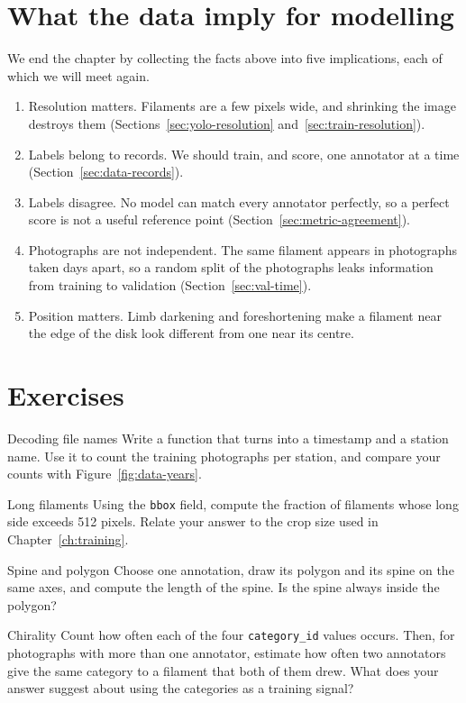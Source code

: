 \section{What the data imply for modelling}\label{sec:data-implications}
We end the chapter by collecting the facts above into five implications, each of which we will
meet again.
\begin{enumerate}[leftmargin=*,itemsep=2pt]
\item Resolution matters. Filaments are a few pixels wide, and shrinking the image destroys them
(Sections~\ref{sec:yolo-resolution} and~\ref{sec:train-resolution}).
\item Labels belong to records. We should train, and score, one annotator at a time
(Section~\ref{sec:data-records}).
\item Labels disagree. No model can match every annotator perfectly, so a perfect score is not a
useful reference point (Section~\ref{sec:metric-agreement}).
\item Photographs are not independent. The same filament appears in photographs taken days apart,
so a random split of the photographs leaks information from training to validation
(Section~\ref{sec:val-time}).
\item Position matters. Limb darkening and foreshortening make a filament near the edge of the disk
look different from one near its centre.
\end{enumerate}

\section*{Exercises}
\begin{exercise}{Decoding file names}
Write a function that turns  into a timestamp and a station name. Use
it to count the training photographs per station, and compare your counts with
Figure~\ref{fig:data-years}.
\end{exercise}

\begin{exercise}{Long filaments}
Using the \texttt{bbox} field, compute the fraction of filaments whose long side exceeds 512
pixels. Relate your answer to the crop size used in Chapter~\ref{ch:training}.
\end{exercise}

\begin{exercise}{Spine and polygon}
Choose one annotation, draw its polygon and its spine on the same axes, and compute the length of
the spine. Is the spine always inside the polygon?
\end{exercise}

\begin{exercise}{Chirality}
Count how often each of the four \texttt{category\_id} values occurs. Then, for photographs with
more than one annotator, estimate how often two annotators give the same category to a filament
that both of them drew. What does your answer suggest about using the categories as a training
signal?
\end{exercise}
